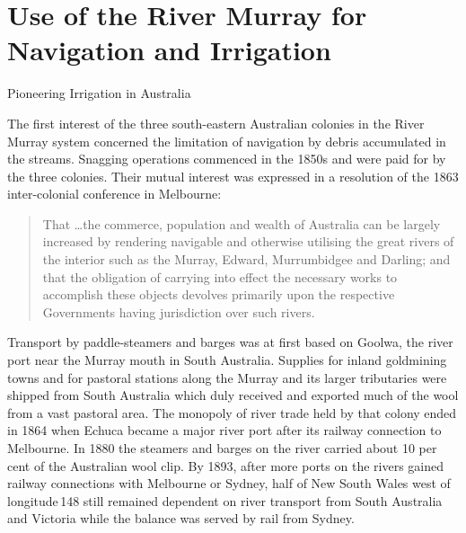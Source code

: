
\setcounter{endnote}{0}

\chapter{Use of the River Murray for Navigation and Irrigation}
\label{ch:murray}
%
{Pioneering Irrigation in Australia}

The first interest of the three south-eastern Australian colonies in
the River Murray system concerned the limitation of navigation by
debris accumulated in the streams.  Snagging operations commenced in
the 1850s and were paid for by the three colonies.  Their mutual
interest was expressed in a resolution of the 1863 inter-colonial
conference in Melbourne:
\begin{quote}
	That \ldots the commerce, population and wealth of Australia
	can be largely increased by rendering navigable and otherwise
	utilising the great rivers of the interior such as the Murray,
	Edward, Murrumbidgee and Darling; and that the obligation of
	carrying into effect the necessary works to accomplish these
	objects devolves primarily upon the respective Governments
	having jurisdiction over such rivers.
\end{quote}

Transport by paddle-steamers  and barges was at
first based on Goolwa,  the river port near the
Murray mouth in South Australia.  Supplies for inland goldmining towns
and for pastoral stations along the Murray and its larger tributaries
were shipped from South Australia which duly received and exported
much of the wool from a vast pastoral area.  The monopoly of river
trade held by that colony ended in 1864 when Echuca  became a major river port after its railway connection to
Melbourne.  In 1880 the steamers and barges on the river carried about
10 per cent of the Australian wool clip.  By 1893, after more ports on
the rivers gained railway connections with Melbourne or Sydney, half
of New South Wales west of longitude\,148 still remained dependent on
river transport from South Australia and Victoria while the balance
was served by rail from Sydney.

